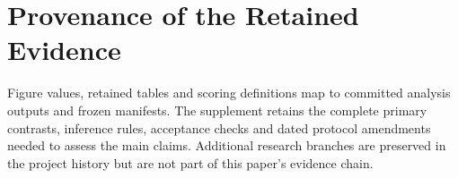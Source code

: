 \section{Provenance of the Retained Evidence}
\label{app:figsrc}
Figure values, retained tables and scoring definitions map to committed analysis outputs and frozen manifests. The supplement retains the complete primary contrasts, inference rules, acceptance checks and dated protocol amendments needed to assess the main claims. Additional research branches are preserved in the project history but are not part of this paper's evidence chain.
